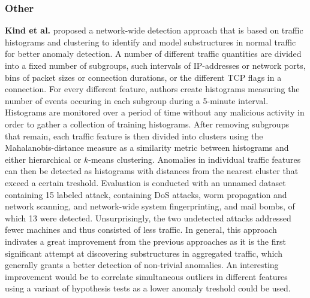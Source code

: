 \documentclass[a4paper,12pt,twoside]{report}
\begin{document}
\subsubsection*{Other}



\textbf{Kind et al.} \cite{kind2009histogram} proposed a network-wide detection approach that is based on traffic histograms and clustering to identify and model substructures in normal traffic for better anomaly detection. A number of different traffic quantities are divided into a fixed number of subgroups, such intervals of IP-addresses or network ports, bins of packet sizes or connection durations, or the different TCP flags in a connection. For every different feature, authors create histograms measuring the number of events occuring in each subgroup during a 5-minute interval. Histograms are monitored over a period of time without any malicious activity in order to gather a collection of training histograms. After removing subgroups that remain, each traffic feature is then divided into clusters using the Mahalanobis-distance measure as a similarity metric between histograms and either hierarchical or $k$-means clustering. Anomalies in individual traffic features can then be detected as histograms with distances from the nearest cluster that exceed a certain treshold. Evaluation is conducted with an unnamed dataset containing 15 labeled attack, containing DoS attacks, worm propagation and network scanning, and network-wide system fingerprinting, and mail bombs, of which 13 were detected. Unsurprisingly, the two undetected attacks addressed fewer machines and thus consisted of less traffic. In general, this approach indivates a great improvement from the previous approaches as it is the first significant attempt at discovering substructures in aggregated traffic, which generally grants a better detection of non-trivial anomalies. An interesting improvement would be to correlate simultaneous outliers in different features using a variant of hypothesis tests as a lower anomaly treshold could be used.
\end{document}
